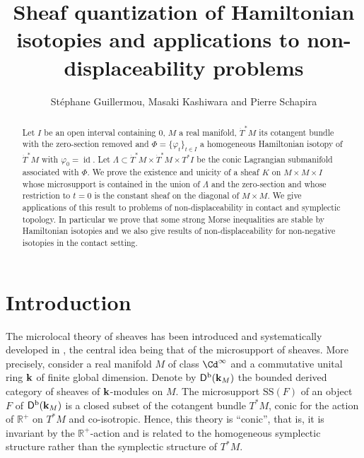\documentclass[12pt,leqno]{article}
\date{}
\theoremstyle{definition}
\newcommand{\R}{{\mathbb{R}}}
\def\phi{{\varphi}}
\newcommand{\cor}{{\bf k}}
\DeclareMathOperator{\id}{id}
\newcommand{\Der}[1][]{\mathsf{D}^{#1}}
\newcommand{\Derb}{\Der[\mathrm{b}]}
\newcommand{\SSi}{\mathrm{SS}}
\newcommand{\dT}{{\dot{T}}}
\newcommand{\dTM}{{\dT}^*M}
\numberwithin{equation}{section}
\begin{document}
\title{Sheaf quantization of Hamiltonian isotopies and applications to
non-displaceability problems}
\author{St{\'e}phane Guillermou, Masaki Kashiwara and Pierre Schapira} 
\maketitle
{}


\begin{abstract}
Let $I$ be an open interval containing $0$,
$M$ a real manifold,
$\dTM$ its cotangent bundle with the zero-section
removed and $\Phi=\{\phi_t\}_{t\in I}$ a homogeneous
Hamiltonian isotopy of $\dTM$ with $\phi_0=\id$.
Let $\Lambda\subset \dTM\times \dTM\times T^*I$ be the conic Lagrangian
submanifold associated with $\Phi$. 
We prove the existence and unicity of a sheaf $K$ on $M\times M\times I$ whose
microsupport is contained in the union of $\Lambda$ and the zero-section and
whose restriction to $t=0$ is the constant sheaf on the diagonal of  
$M\times M$.
We give applications of this result to problems of non-displaceability in
contact and symplectic topology. In particular we prove that some
strong Morse inequalities are stable by Hamiltonian isotopies and we
 also give results of non-displaceability for non-negative isotopies
in the contact setting.
\end{abstract}





\section*{Introduction}
The microlocal theory of sheaves has been introduced and systematically
developed in \cite{KS82,KS85,KS90}, the central idea being that of the
microsupport of sheaves. More precisely, consider a real manifold $M$ of class
$\Cd^\infty$ and a commutative unital ring $\cor$ of finite global dimension.
Denote by $\Derb(\cor_M)$ the bounded derived category of sheaves of
$\cor$-modules on $M$. The microsupport $\SSi(F)$ of an object $F$ of
$\Derb(\cor_M)$ is a closed subset of the cotangent bundle $T^*M$, conic for
the action of $\R^+$ on $T^*M$ and co-isotropic. Hence, this theory is
``conic'', that is, it is invariant by the $\R^+$-action and is related to the
homogeneous symplectic structure rather
than the symplectic structure of $T^*M$.
\end{document}
